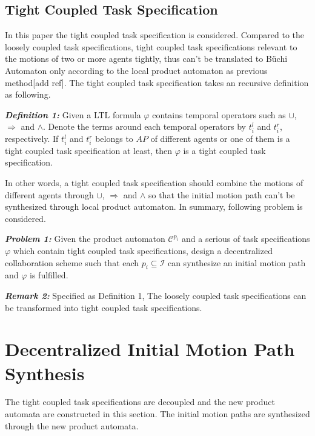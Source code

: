 \documentclass[journal]{IEEEtran}
\begin{document}
\subsection{Tight Coupled Task Specification}
In this paper the tight coupled task specification is considered. Compared to the loosely coupled task specifications, tight coupled task specifications relevant to the motions of two or more agents tightly, thus can't be translated to B\"{u}chi Automaton only according to the local product automaton as previous method[add ref]. The tight coupled task specification takes an recursive definition as following.
\par
\textbf{\emph{Definition 1:}} Given a LTL formula $\varphi$ contains temporal operators such as $\cup$, $\Longrightarrow$ and $\wedge$. Denote the terms around each temporal operators by $t^{l}_i$ and $t^{r}_i$, respectively. If $t^{l}_i$ and $t^{r}_i$ belongs to $AP$ of different agents or one of them is a tight coupled task specification at least, then $\varphi$ is a tight coupled task specification.
\par
In other words, a tight coupled task specification should combine the motions of different agents through $\cup$, $\Longrightarrow$ and $\wedge$ so that the initial motion path can't be synthesized through local product automaton. In summary, following problem is considered.
\par
\textbf{\emph{Problem 1:}} Given the product automaton $\mathcal{C}^{p_i}$ and a serious of task specifications $\varphi$ which contain tight coupled task specifications, design a decentralized collaboration scheme such that each $p_i \subseteq \mathcal{I}$ can synthesize an initial motion path and $\varphi$ is fulfilled.

\textbf{\emph{Remark 2:}} Specified as Definition 1, The loosely coupled task specifications can be transformed into tight coupled task specifications.
\section{Decentralized Initial Motion Path Synthesis}
The tight coupled task specifications are decoupled and the new product automata are constructed in this section. The initial motion paths are synthesized through the new product automata.
\end{document}
